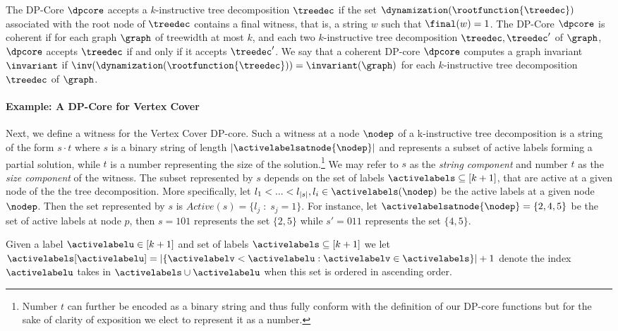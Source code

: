 The DP-Core $\dpcore$ accepts a $k$-instructive tree decomposition  $\treedec$ if the set 
$\dynamization(\rootfunction{\treedec})$ associated with the root node of $\treedec$ contains a final witness, 
that is, a string $w$ such that $\final(w)=1$. The DP-Core $\dpcore$ is coherent if for 
each graph $\graph$ of treewidth at most $k$, and each two $k$-instructive tree 
decomposition $\treedec,\treedec'$ of $\graph$, $\dpcore$ accepts $\treedec$ if and only if 
it accepts $\treedec'$. We say that a coherent DP-core $\dpcore$ computes a graph invariant 
$\invariant$ if $\inv(\dynamization(\rootfunction{\treedec})) = \invariant(\graph)$ for each $k$-instructive tree decomposition $\treedec$ of $\graph$. 



\paragraph*{Example: A DP-Core for Vertex Cover}
\label{subsection:VC}
Next, we define a witness for the {\sc Vertex Cover} DP-core. Such a witness at a node $\nodep$ of a k-instructive tree decomposition is a string of the form $ s\cdot t$ where $s$ is a binary string of length $|\activelabelsatnode{\nodep}|$ and represents a subset of active labels forming a partial solution, while $t$ is a number representing the size of the solution.\footnote{Number $t$ can further be encoded as a binary string and thus fully conform with the definition of our DP-core functions but for the sake of clarity of exposition we elect to represent it as a number.} We may refer to $s$ as the \textit{string component} and number $t$ as the \textit{size component} of the witness. The subset represented by $s$ depends on the set of labels $\activelabels \subseteq [k+1]$, that are active at a given node of the the tree decomposition. More specifically, let $l_1 < ... < l_{|s|}, l_i \in \activelabels(\nodep)$ be the active labels at a given node $\nodep$. Then the set represented by $s$ is $Active(s) = \{l_j \;:\; s_j=1\}$. For instance, let
$\activelabelsatnode{\nodep} = \{2,4,5\}$ be the set of active labels at node $p$, then $s=101$ represents the set $\{2,5\}$ while $s'=011$ represents the set $\{4,5\}$.  

Given a label $\activelabelu \in [k+1]$ and set of labels $\activelabels \subseteq [k+1]$ we let $\activelabels[\activelabelu] = |\{\activelabelv < \activelabelu : \activelabelv \in \activelabels \}|+1$ denote the index $\activelabelu$ takes in $\activelabels \cup \activelabelu$ when this set is ordered in ascending order. 

